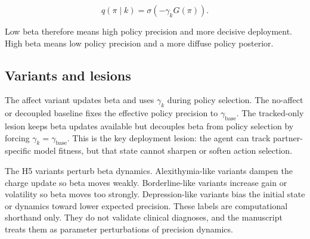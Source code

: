 \begin{equation}
 q(\pi \mid k) = \sigma(-\gamma_k G(\pi)).
\end{equation}

Low beta therefore means high policy precision and more decisive deployment. High beta means low policy precision and a more diffuse policy posterior.

\subsection{Variants and lesions}

The affect variant updates beta and uses $\gamma_k$ during policy selection. The no-affect or decoupled baseline fixes the effective policy precision to $\gamma_{\mathrm{base}}$. The tracked-only lesion keeps beta updates available but decouples beta from policy selection by forcing $\gamma_k=\gamma_{\mathrm{base}}$. This is the key deployment lesion: the agent can track partner-specific model fitness, but that state cannot sharpen or soften action selection.

The H5 variants perturb beta dynamics. Alexithymia-like variants dampen the charge update so beta moves weakly. Borderline-like variants increase gain or volatility so beta moves too strongly. Depression-like variants bias the initial state or dynamics toward lower expected precision. These labels are computational shorthand only. They do not validate clinical diagnoses, and the manuscript treats them as parameter perturbations of precision dynamics.
